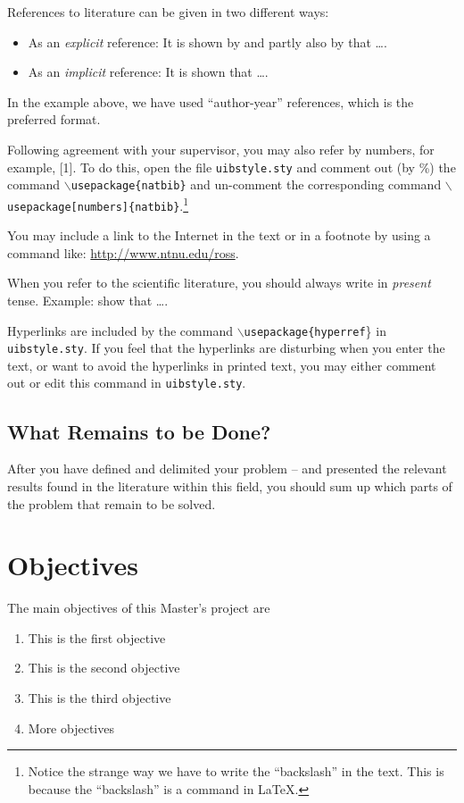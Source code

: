 \documentclass[../Main/thesis.tex]{subfiles}
\begin{document}
References to literature can be given in two different ways:
\begin{itemize}
\item As an \emph{explicit} reference: It is shown by \citet{lundteigen08} and partly also by \citet{rausand14}  that \ldots.
\item As an \emph{implicit} reference: It is shown \citep[e.g., see][Chap. 4]{rausand04} that \ldots.
\end{itemize}
In the example above, we have used ``author-year'' references, which is the preferred format. 
\begin{remark}
Following agreement with your supervisor, you may also refer by numbers, for example,  [1]. 
To do this, open the file \texttt{uibstyle.sty} and  comment out (by \%) the command \texttt{$\backslash$usepackage\{natbib\}} and un-comment the corresponding command \texttt{$\backslash$usepackage[numbers]\{natbib\}}.\footnote{Notice the strange way we have to write the ``backslash'' in the text. 
This is because the ``backslash'' is a command in \LaTeX.}
\end{remark}
 You may include a link to the Internet in the text or in a footnote by using a command like: \url{http://www.ntnu.edu/ross}. 

When you refer to the scientific literature, you should always write in \emph{present} tense. 
Example: \citet{rausand04} show that \ldots.

\begin{remark}
Hyperlinks are included by the command \texttt{$\backslash$usepackage\{hyperref}\} in \texttt{uibstyle.sty}. 
If you feel that the hyperlinks are disturbing when you enter the text, or want to avoid the hyperlinks in printed text, you may either comment out or edit this command in \texttt{uibstyle.sty}.
\end{remark}
\subsection*{What Remains to be Done?}
After you have defined and delimited your problem -- and presented the relevant results found in the literature within this field, you should sum up which parts of the problem that remain to be solved.
\section{Objectives}
\label{sec:objectives}
The main objectives of this Master's project are
\begin{enumerate}
\item This is the first objective
\item This is the second objective
\item This is the third objective
\item More objectives
\end{enumerate}
\end{document}
